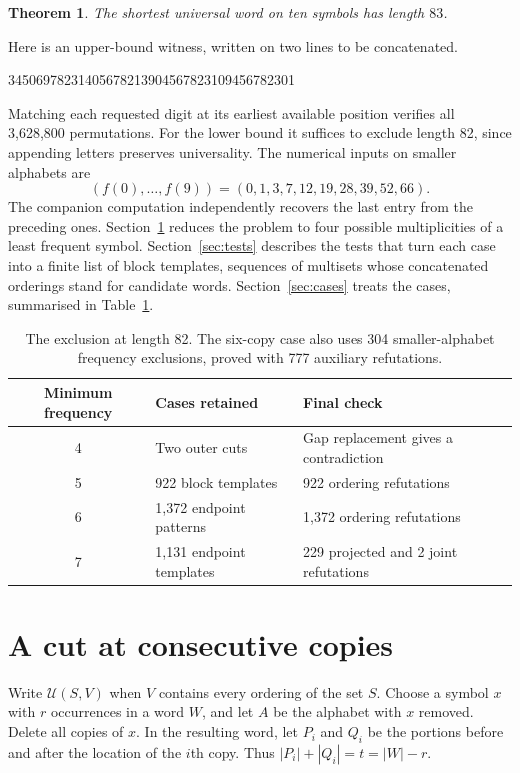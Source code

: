 \documentclass[11pt]{article}
\newtheorem{theorem}{Theorem}
\newcommand{\cov}{\mathcal U}
\begin{document}
\begin{theorem}\label{thm:main}
The shortest universal word on ten symbols has length $83$.
\end{theorem}
Here is an upper-bound witness, written on two lines to be concatenated.
\begin{center}\par
34506978231405678213904567823109456782301
\end{center}
Matching each requested digit at its earliest available position verifies all 3,628,800 permutations. For the lower bound it suffices to exclude length 82, since appending letters preserves universality. The numerical inputs on smaller alphabets are
\[
(f(0),\ldots,f(9))=(0,1,3,7,12,19,28,39,52,66).
\]
The companion computation independently recovers the last entry from the preceding ones. Section~\ref{sec:cut} reduces the problem to four possible multiplicities of a least frequent symbol. Section~\ref{sec:tests} describes the tests that turn each case into a finite list of block templates, sequences of multisets whose concatenated orderings stand for candidate words. Section~\ref{sec:cases} treats the cases, summarised in Table~\ref{tab:cases}.

\begin{table}[ht]
\centering\small
\begin{tabular}{cll}
\toprule
Minimum frequency & Cases retained & Final check\\
\midrule
4 & Two outer cuts & Gap replacement gives a contradiction\\
5 & 922 block templates & 922 ordering refutations\\
6 & 1,372 endpoint patterns & 1,372 ordering refutations\\
7 & 1,131 endpoint templates & 229 projected and 2 joint refutations\\
\bottomrule
\end{tabular}
\caption{The exclusion at length 82. The six-copy case also uses 304 smaller-alphabet frequency exclusions, proved with 777 auxiliary refutations.}\label{tab:cases}
\end{table}

\section{A cut at consecutive copies}\label{sec:cut}
Write $\cov(S,V)$ when $V$ contains every ordering of the set $S$. Choose a symbol $x$ with $r$ occurrences in a word $W$, and let $A$ be the alphabet with $x$ removed. Delete all copies of $x$. In the resulting word, let $P_i$ and $Q_i$ be the portions before and after the location of the $i$th copy. Thus $|P_i|+|Q_i|=t=|W|-r$.
\end{document}
